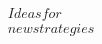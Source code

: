\documentclass[preview]{standalone}
\begin{document}
\begin{align*}
Ideas for\\new strategies
\end{align*}
\end{document}
